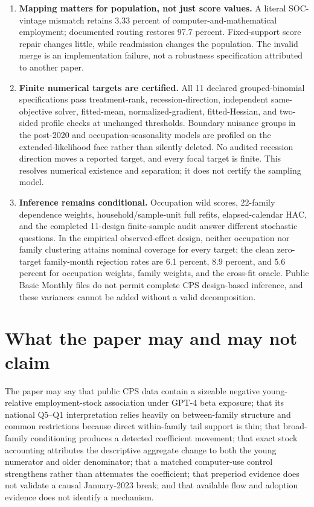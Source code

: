 \documentclass[11pt,letterpaper]{article}
\begin{document}
\begin{enumerate}[leftmargin=1.8em]
\item \textbf{Mapping matters for population, not just score values.}  A literal SOC-vintage mismatch retains 3.33 percent of computer-and-mathematical employment; documented routing restores 97.7 percent.  Fixed-support score repair changes little, while readmission changes the population.  The invalid merge is an implementation failure, not a robustness specification attributed to another paper.
\item \textbf{Finite numerical targets are certified.}  All 11 declared grouped-binomial specifications pass treatment-rank, recession-direction, independent same-objective solver, fitted-mean, normalized-gradient, fitted-Hessian, and two-sided profile checks at unchanged thresholds.  Boundary nuisance groups in the post-2020 and occupation-seasonality models are profiled on the extended-likelihood face rather than silently deleted.  No audited recession direction moves a reported target, and every focal target is finite.  This resolves numerical existence and separation; it does not certify the sampling model.
\item \textbf{Inference remains conditional.}  Occupation wild scores, 22-family dependence weights, household/sample-unit full refits, elapsed-calendar HAC, and the completed 11-design finite-sample audit answer different stochastic questions.  In the empirical observed-effect design, neither occupation nor family clustering attains nominal coverage for every target; the clean zero-target family-month rejection rates are 6.1 percent, 8.9 percent, and 5.6 percent for occupation weights, family weights, and the cross-fit oracle.  Public Basic Monthly files do not permit complete CPS design-based inference, and these variances cannot be added without a valid decomposition.
\end{enumerate}

\section*{What the paper may and may not claim}

The paper may say that public CPS data contain a sizeable negative young-relative employment-stock association under GPT-4 beta exposure; that its national Q5--Q1 interpretation relies heavily on between-family structure and common restrictions because direct within-family tail support is thin; that broad-family conditioning produces a detected coefficient movement; that exact stock accounting attributes the descriptive aggregate change to both the young numerator and older denominator; that a matched computer-use control strengthens rather than attenuates the coefficient; that preperiod evidence does not validate a causal January-2023 break; and that available flow and adoption evidence does not identify a mechanism.
\end{document}
